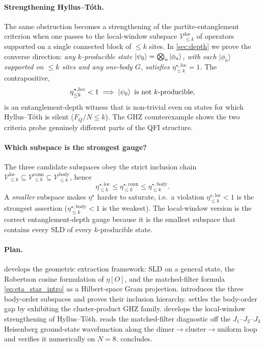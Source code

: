 \documentclass[11pt,a4paper]{article}
\newcommand{\FQ}{F_Q}
\newcommand{\PsiZ}{\ket{\psi_0}}
\newcommand{\Vbody}[1]{\mathcal{V}^{\mathrm{body}}_{\le #1}}
\newcommand{\Vconn}[1]{\mathcal{V}^{\mathrm{conn}}_{\le #1}}
\newcommand{\Vloc}[1]{\mathcal{V}^{\mathrm{loc}}_{\le #1}}
\newcommand{\etabody}[1]{\eta^{\star,\mathrm{body}}_{\le #1}}
\newcommand{\etaconn}[1]{\eta^{\star,\mathrm{conn}}_{\le #1}}
\newcommand{\etaloc}[1]{\eta^{\star,\mathrm{loc}}_{\le #1}}
\begin{document}
\paragraph{Strengthening Hyllus--T\'oth.}  The same obstruction
becomes a strengthening of the partite-entanglement criterion when
one passes to the local-window subspace $\Vloc{k}$ of operators
supported on a single connected block of $\le k$ sites.  In
\cref{sec:depth} we prove the converse direction:
\emph{any $k$-producible state $\PsiZ=\bigotimes_a|\phi_a\rangle$,
with each $|\phi_a\rangle$ supported on $\le k$ sites and any
one-body $G$, satisfies $\etaloc{k}=1$}.  The contrapositive,
\begin{equation}
   \etaloc{k}<1\;\Longrightarrow\;\PsiZ\text{ is not $k$-producible},
   \label{eq:depth_intro}
\end{equation}
is an entanglement-depth witness that is non-trivial even on
states for which Hyllus--T\'oth is silent ($\FQ/N\le k$).  The GHZ
counterexample shows the two criteria probe genuinely different
parts of the QFI structure.

\paragraph{Which subspace is the strongest gauge?}  The three
candidate subspaces obey the strict inclusion chain
$\Vloc{k}\subseteq\Vconn{k}\subseteq\Vbody{k}$, hence
\begin{equation}
   \etaloc{k}\le\etaconn{k}\le\etabody{k}.
   \label{eq:hierarchy_intro}
\end{equation}
A \emph{smaller} subspace makes $\eta^\star$ harder to saturate,
i.e.\ a violation $\etaloc{k}<1$ is the strongest assertion
($\etabody{k}<1$ is the weakest).  The local-window version is the
correct entanglement-depth gauge because it is the smallest
subspace that contains every SLD of every $k$-producible state.

\paragraph{Plan.}   develops the geometric
extraction framework: SLD on a general state, the Robertson cosine
formulation of $\eta[O]$, and the matched-filter formula
\eqref{eq:eta_star_intro} as a Hilbert-space Gram projection.
 introduces the three body-order subspaces and
proves their inclusion hierarchy.   settles the
body-order gap by exhibiting the cluster-product GHZ family.
 develops the local-window strengthening of
Hyllus--T\'oth.   reads the matched-filter
diagnostic off the $J_1$--$J_2$--$J_3$ Heisenberg ground-state
wavefunction along the dimer$\to$cluster$\to$uniform loop and
verifies it numerically on $N=8$.  
concludes.
\end{document}
